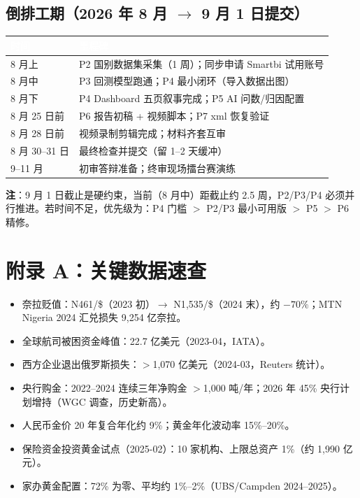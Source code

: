 \documentclass[UTF8,12pt]{ctexart}
\begin{document}
\subsection{倒排工期（2026 年 8 月 $\to$ 9 月 1 日提交）}

\begin{longtable}{p{3.0cm}p{11.6cm}}
\toprule
\rowcolor{navy}\textcolor{white}{\textbf{时间}} & \textcolor{white}{\textbf{里程碑}} \\
\midrule
8 月上 & P2 国别数据集采集（1 周）；同步申请 Smartbi 试用账号 \\
8 月中 & P3 回测模型跑通；P4 最小闭环（导入数据出图） \\
8 月下 & P4 Dashboard 五页叙事完成；P5 AI 问数/归因配置 \\
8 月 25 日前 & P6 报告初稿 + 视频脚本；P7 xml 恢复验证 \\
8 月 28 日前 & 视频录制剪辑完成；材料齐套互审 \\
8 月 30--31 日 & 最终检查并提交（留 1--2 天缓冲） \\
9--11 月 & 初审答辩准备；终审现场擂台赛演练 \\
\bottomrule
\end{longtable}

\noindent\textbf{注}：9 月 1 日截止是硬约束，当前（8 月中）距截止约 2.5 周，P2/P3/P4 必须并行推进。若时间不足，优先级为：P4 门槛 $>$ P2/P3 最小可用版 $>$ P5 $>$ P6 精修。

\appendix
\section{附录 A：关键数据速查}

\begin{itemize}
\item 奈拉贬值：N461/\$（2023 初）$\to$ N1{,}535/\$（2024 末），约 $-70\%$；MTN Nigeria 2024 汇兑损失 9{,}254 亿奈拉。
\item 全球航司被困资金峰值：22.7 亿美元（2023-04，IATA）。
\item 西方企业退出俄罗斯损失：$>$1{,}070 亿美元（2024-03，Reuters 统计）。
\item 央行购金：2022--2024 连续三年净购金 $>$1{,}000 吨/年；2026 年 45\% 央行计划增持（WGC 调查，历史新高）。
\item 人民币金价 20 年复合年化约 9\%；黄金年化波动率 15\%--20\%。
\item 保险资金投资黄金试点（2025-02）：10 家机构、上限总资产 1\%（约 1{,}990 亿元）。
\item 家办黄金配置：72\% 为零、平均约 1\%--2\%（UBS/Campden 2024--2025）。
\end{itemize}
\end{document}
